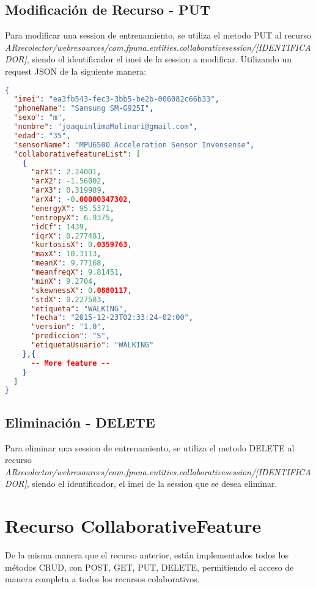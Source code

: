 \subsection{Modificación de Recurso - PUT}

Para modificar una session de entrenamiento, se utiliza el metodo PUT al recurso \textit{ARrecolector/webresources/com.fpuna.entities.collaborativesession/[IDENTIFICADOR]}, siendo el identificador el imei de la session a modificar. Utilizando un request JSON de la siguiente manera:

\begin{lstlisting}[language=json,firstnumber=1,label={lst:PUT}]
{
  "imei": "ea3fb543-fec3-3bb5-be2b-006082c66b33",
  "phoneName": "Samsung SM-G925I",
  "sexo": "m",
  "nombre": "joaquinlimaMolinari@gmail.com",
  "edad": "35",
  "sensorName": "MPU6500 Acceleration Sensor Invensense",
  "collaborativefeatureList": [
    {
      "arX1": 2.24001,
      "arX2": -1.56002,
      "arX3": 0.319989,
      "arX4": -0.00000347302,
      "energyX": 95.5371,
      "entropyX": 6.9375,
      "idCf": 1439,
      "iqrX": 0.277481,
      "kurtosisX": 0.0359763,
      "maxX": 10.3113,
      "meanX": 9.77168,
      "meanfreqX": 9.81451,
      "minX": 9.2704,
      "skewnessX": 0.0880117,
      "stdX": 0.227583,
      "etiqueta": "WALKING",
      "fecha": "2015-12-23T02:33:24-02:00",
      "version": "1.0",
      "prediccion": "S",
      "etiquetaUsuario": "WALKING"
    },{ 
      -- More feature -- 
    }  
  ]
}
\end{lstlisting}

\subsection{Eliminación - DELETE}

Para eliminar una session de entrenamiento, se utiliza el metodo DELETE al recurso \textit{ARrecolector/webresources/com.fpuna.entities.collaborativesession/[IDENTIFICADOR]}, siendo el identificador, el imei de la session que se desea eliminar. 

\section{Recurso CollaborativeFeature}

De la misma manera que el recurso anterior, están implementados todos los métodos CRUD, con POST, GET, PUT, DELETE, permitiendo el acceso de manera completa a todos los recursos colaborativos.